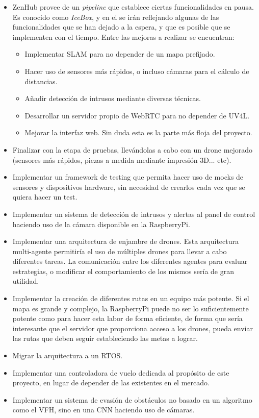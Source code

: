 \begin{itemize}
\item ZenHub provee de un \textit{pipeline} que establece ciertas funcionalidades en pausa. Es conocido como \emph{IceBox}, y en el se irán reflejando algunas de las funcionalidades que se han dejado a la espera, y que es posible que se implementen con el tiempo. Entre las mejoras a realizar se encuentran:
\begin{itemize}
\item Implementar SLAM para no depender de un mapa prefijado.
\item Hacer uso de sensores más rápidos, o incluso cámaras para el cálculo de distancias.
\item Añadir detección de intrusos mediante diversas técnicas.
\item Desarrollar un servidor propio de WebRTC para no depender de UV4L.
\item Mejorar la interfaz web. Sin duda esta es la parte más floja del proyecto.
\end{itemize}
\item Finalizar con la etapa de pruebas, llevándolas a cabo con un drone mejorado (sensores más rápidos, piezas a medida mediante impresión 3D... etc).
\item Implementar un framework de testing que permita hacer uso de mocks de sensores y dispositivos hardware, sin necesidad de crearlos cada vez que se quiera hacer un test.
\item Implementar un sistema de detección de intrusos y alertas al panel de control haciendo uso de la cámara disponible en la RaspberryPi. 
\item Implementar una arquitectura de enjambre de drones. Esta arquitectura multi-agente permitiría el uso de múltiples drones para llevar a cabo diferentes tareas. La comunicación entre los diferentes agentes para evaluar estrategias, o modificar el comportamiento de los mismos sería de gran utilidad. 
\item Implementar la creación de diferentes rutas en un equipo más potente. Si el mapa es grande y complejo, la RaspberryPi puede no ser lo suficientemente potente como para hacer esta labor de forma eficiente, de forma que sería interesante que el servidor que proporciona acceso a los drones, pueda enviar las rutas que deben seguir estableciendo las metas a lograr.
\item Migrar la arquitectura a un RTOS. 
\item Implementar una controladora de vuelo dedicada al propósito de este proyecto, en lugar de depender de las existentes en el mercado.
\item Implementar un sistema de evasión de obstáculos no basado en un algoritmo como el VFH, sino en una CNN haciendo uso de cámaras.
\end{itemize}